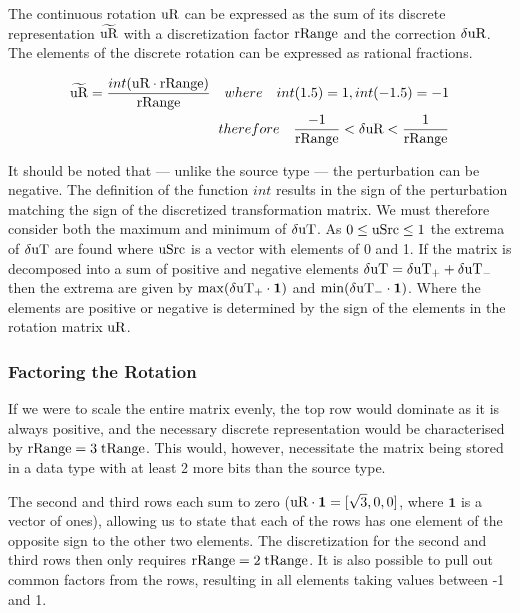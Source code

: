 The continuous rotation $\text{uR}$ can be expressed as the sum of its discrete representation $\widetilde{\text{uR}}$ with a discretization factor $\text{rRange}$ and the correction $\delta\text{uR}$. The elements of the discrete rotation can be expressed as rational fractions.

\begin{eqnarray}\label{eq:dRRange}
\widetilde{\text{uR}} = \dfrac{int(\text{uR} \cdot \text{rRange})}{\text{rRange}}\quad where\quad int(1.5) = 1, int (-1.5) = -1\\
therefore\quad \dfrac{-1}{\text{rRange}} < \delta\text{uR}  < \dfrac{1}{\text{rRange}}
\end{eqnarray}

It should be noted that --- unlike the source type \uSrc --- the perturbation can be negative. The definition of the function $int$ results in the sign of the perturbation matching the sign of the discretized transformation matrix. We must therefore consider both the maximum and minimum of $\delta\text{uT}$. As $0 \le\text{uSrc} \le 1$ the extrema of $\delta\text{uT}$ are found where $\text{uSrc}$ is a vector with elements of 0 and 1. If the matrix is decomposed into a sum of positive and negative elements $\delta\text{uT} = \delta\text{uT}_+ + \delta\text{uT}_-$ then the extrema are given by $\max(\delta\text{uT}_+ \cdot \mathbf{1})$ and $\min(\delta\text{uT}_- \cdot \mathbf{1})$. Where the elements are positive or negative is determined by the sign of the elements in the rotation matrix $\text{uR}$.

\subsubsection{Factoring the Rotation}

If we were to scale the entire matrix evenly, the top row would dominate as it is always positive, and the necessary discrete representation would be characterised by $\text{rRange} = 3 \; \text{tRange}$. This would, however, necessitate the matrix being stored in a data type with at least 2 more bits than the source type.

The second and third rows each sum to zero ($\text{uR} \cdot \mathbf{1} = [\sqrt{3},0,0]$, where $\mathbf{1}$ is a vector of ones), allowing us to state that each of the rows has one element of the opposite sign to the other two elements. The discretization for the second and third rows then only requires $\text{rRange} = 2 \; \text{tRange}$. It is also possible to pull out common factors from the rows, resulting in all elements taking values between -1 and 1.

